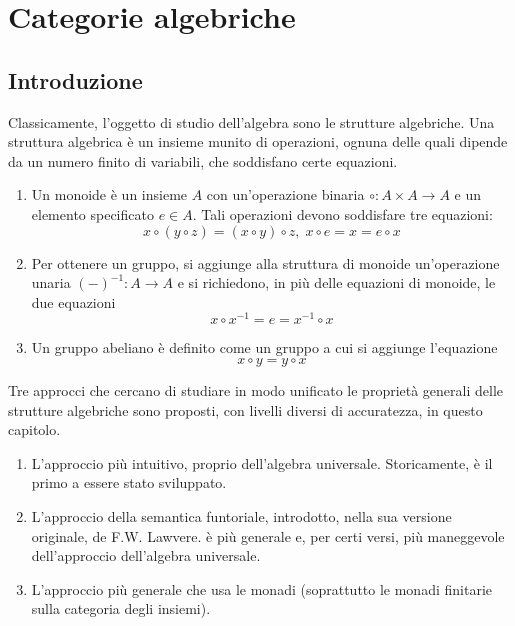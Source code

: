 \chapter{Categorie algebriche}\label{cap_cat_alg}

\section{Introduzione}\label{sec_intro}

Classicamente, l'oggetto di studio dell'algebra sono le strutture algebriche. Una struttura algebrica è un insieme munito di operazioni,
ognuna delle quali dipende da un numero finito di variabili, che soddisfano certe equazioni.

\begin{examples}\label{esempi_strutture_alg}\leavevmode
	\begin{enumerate}
		\item Un monoide è un insieme \(A\) con un'operazione binaria \(\circ \colon A \times A \to A\) e un elemento specificato \(e \in A\). Tali
		      operazioni devono soddisfare tre equazioni:
		      \[
			      x \circ (y \circ z) = (x \circ y) \circ z, \; x \circ e = x = e \circ x
		      \]
		\item Per ottenere un gruppo, si aggiunge alla struttura di monoide un'operazione unaria \((-)^{-1} \colon A \to A\) e si richiedono, in più
		      delle equazioni di monoide, le due equazioni
		      \[
			      x \circ x^{-1} = e = x^{-1} \circ x
		      \]
		\item Un gruppo abeliano è definito come un gruppo a cui si aggiunge l'equazione
		      \[
			      x \circ y = y \circ x
		      \]
	\end{enumerate}
\end{examples}

Tre approcci che cercano di studiare in modo unificato le proprietà generali delle strutture algebriche sono proposti, con livelli diversi di
accuratezza, in questo capitolo.
\begin{enumerate}
	\item L'approccio più intuitivo, proprio dell'algebra universale. Storicamente, è il primo a essere stato sviluppato.
	\item L'approccio della semantica funtoriale, introdotto, nella sua versione originale, de F.W. Lawvere. è più generale e, per certi versi, più
	      maneggevole dell'approccio dell'algebra universale.
	\item L'approccio più generale che usa le monadi (soprattutto le monadi finitarie sulla categoria degli insiemi).
\end{enumerate}

